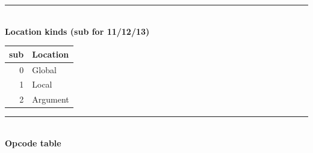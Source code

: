 \documentclass[a4paper]{article}
\begin{document}
\begin{minipage}[t]{0.48\textwidth}
\vspace{6pt}
{\color{HdrBlue}\rule{\linewidth}{1.2pt}}\\[2pt]
{\small\sffamily\bfseries\color{HdrBlue}Location kinds (sub for 11/12/13)}
\vspace{3pt}

{\footnotesize\sffamily
\begin{tabular}{@{}rl@{}}
\toprule
\textbf{sub} & \textbf{Location} \\
\midrule
0 & Global \\
1 & Local \\
2 & Argument \\
\bottomrule
\end{tabular}
}

\end{minipage}

\bigskip

{\color{CodeRed}\rule{\linewidth}{1.2pt}}\\[2pt]
{\small\sffamily\bfseries\color{CodeRed}Opcode table}
\vspace{3pt}
\end{document}
